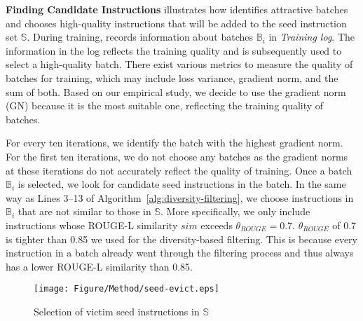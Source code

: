 \begin{comment}
\FIG{fig:seed-update} illustrates the details of updating 
seed instructions. 
We identify high-quality batches 
that greatly contribute to training and then,
from these batches, we select 
instructions 
that are not redundant with those already in the 
seed instruction set. These selected instructions are finally included in the seed instruction set.
\end{comment}

\textbf{Finding Candidate Instructions}
 illustrates how \ours{} identifies attractive
batches and chooses high-quality instructions that will
be added to the seed instruction set $\mathbb{S}$.
During training, \ours{} records information about batches $\mathbb{B}_i$
in \textit{Training log}.
The information in the log reflects the training quality and is subsequently used 
to select a high-quality batch. 
There exist various metrics to measure the quality of batches for training,
which may include loss variance, gradient norm, and the sum of both.
Based on our empirical study, we decide to use the gradient norm (GN) because 
it is the most suitable one, reflecting the training quality of batches.



For every ten iterations, we identify the batch with the highest gradient norm. 
For the first ten iterations, we do not choose any batches 
as the gradient norms at these iterations 
do not accurately reflect the quality of training.
Once a batch $\mathbb{B}_{i}$ is selected, we look for candidate seed instructions
in the batch.
In the same way as Lines 3--13 of Algorithm~\ref{alg:diversity-filtering}, 
we choose instructions in $\mathbb{B}_{i}$ that are not similar to those in $\mathbb{S}$. More specifically,
we only include instructions whose ROUGE-L similarity $sim$ exceeds 
$\theta_{ROUGE}=0.7$. $\theta_{ROUGE}$ of 0.7 is tighter %
than 0.85 we used
for the diversity-based filtering. 
This is because every instruction in a batch already went through
the filtering process and thus always has
a lower ROUGE-L similarity than 0.85.
\begin{figure}[t]
    \centering
    \texttt{[image: Figure/Method/seed-evict.eps]}
    \caption{Selection of victim seed instructions in $\mathbb{S}$}
    \label{fig:seed-evict}
\end{figure}

